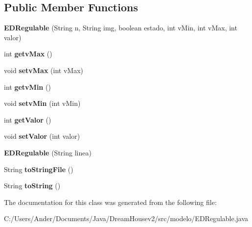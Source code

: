 \subsection*{Public Member Functions}
\begin{DoxyCompactItemize}
\item 
\mbox{\label{classmodelo_1_1_e_d_regulable_aa269c52c783882ba76f21807dba145d7}} 
{\bfseries E\+D\+Regulable} (String n, String img, boolean estado, int v\+Min, int v\+Max, int valor)
\item 
\mbox{\label{classmodelo_1_1_e_d_regulable_a1cd8aedd21851c563533c41a7f093b89}} 
int {\bfseries getv\+Max} ()
\item 
\mbox{\label{classmodelo_1_1_e_d_regulable_a92f95c7d268e4c0c8f400822acff96e9}} 
void {\bfseries setv\+Max} (int v\+Max)
\item 
\mbox{\label{classmodelo_1_1_e_d_regulable_a29ff167bb69c6cdd44964d8a9703d098}} 
int {\bfseries getv\+Min} ()
\item 
\mbox{\label{classmodelo_1_1_e_d_regulable_a9b665b5cb50aa079f2c3ecde2101a96a}} 
void {\bfseries setv\+Min} (int v\+Min)
\item 
\mbox{\label{classmodelo_1_1_e_d_regulable_a1d6a61d20c823c5bd383b0e4e841644e}} 
int {\bfseries get\+Valor} ()
\item 
\mbox{\label{classmodelo_1_1_e_d_regulable_ad34348929673372480fe4f0e7fc50305}} 
void {\bfseries set\+Valor} (int valor)
\item 
\mbox{\label{classmodelo_1_1_e_d_regulable_a9e9ad99f51d31c38bf7c0a1bdb826ee4}} 
{\bfseries E\+D\+Regulable} (String linea)
\item 
\mbox{\label{classmodelo_1_1_e_d_regulable_a99c9d9c305eab98d121ba917a042ae3e}} 
String {\bfseries to\+String\+File} ()
\item 
\mbox{\label{classmodelo_1_1_e_d_regulable_a5802caa573177c48bda77ae4d9e487a9}} 
String {\bfseries to\+String} ()
\end{DoxyCompactItemize}


The documentation for this class was generated from the following file\+:\begin{DoxyCompactItemize}
\item 
C\+:/\+Users/\+Ander/\+Documents/\+Java/\+Dream\+Housev2/src/modelo/E\+D\+Regulable.\+java\end{DoxyCompactItemize}
